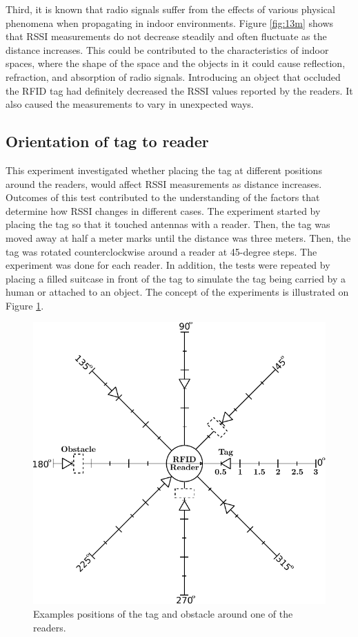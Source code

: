 Third, it is known that radio signals suffer from the effects of various physical phenomena when propagating in indoor environments. Figure \ref{fig:13m} shows that RSSI measurements do not decrease steadily and often fluctuate as the distance increases. This could be contributed to the characteristics of indoor spaces, where the shape of the space and the objects in it could cause reflection, refraction, and absorption of radio signals. Introducing an object that occluded the RFID tag had definitely decreased the RSSI values reported by the readers. It also caused the measurements to vary in unexpected ways.


\subsection{Orientation of tag to reader}

This experiment investigated whether placing the tag at different positions around the readers, would affect RSSI measurements as distance increases. Outcomes of this test contributed to the understanding of the factors that determine how RSSI changes in different cases. The experiment started by placing the tag so that it touched antennas with a reader. Then, the tag was moved away at half a meter marks until the distance was three meters. Then, the tag was rotated counterclockwise around a reader at 45-degree steps. The experiment was done for each reader. In addition, the tests were repeated by placing a filled suitcase in front of the tag to simulate the tag being carried by a human or attached to an object. The concept of the experiments is illustrated on Figure \ref{fig:ori}.
\begin{figure}[h]
	\begin{center}
		\includegraphics[width=.5\textwidth]{figures/exp/orientation}
		\caption{Examples positions of the tag and obstacle around one of the readers. }
		\label{fig:ori}
	\end{center}
\end{figure}

